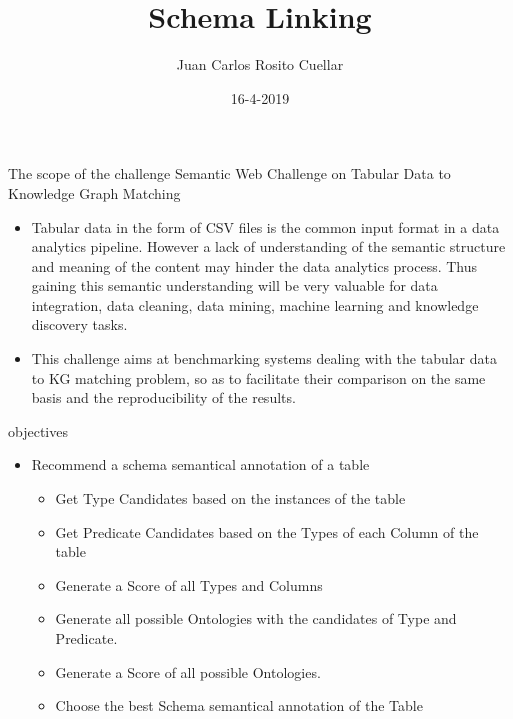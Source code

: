 \documentclass{beamer}
\title[Schema-Linking \hspace{0.5cm}\insertframenumber/\inserttotalframenumber]{Schema Linking}
\author{Juan Carlos Rosito Cuellar}
\institute{Universita' degli studi di Milano-Bicocca}
\date{16-4-2019}
\begin{document}
\begin{frame}
	\titlepage
\end{frame}


\begin{frame}{The scope of the challenge}
	Semantic Web Challenge on Tabular Data to Knowledge Graph Matching
	\begin{itemize}
		\item Tabular data in the form of CSV files is the common input format in a data analytics pipeline. However a lack of understanding of the semantic structure and meaning of the content may hinder the data analytics process. Thus gaining this semantic understanding will be very valuable for data integration, data cleaning, data mining, machine learning and knowledge discovery tasks.
		\item This challenge aims at benchmarking systems dealing with the tabular data to KG matching problem, so as to facilitate their comparison on the same basis and the reproducibility of the results.
	\end{itemize}
\end{frame}

\begin{frame}{objectives}
	\begin{itemize}
		\item Recommend a schema semantical annotation of a table
		      \begin{itemize}
			      \item Get Type Candidates based on the instances of the table
			      \item Get Predicate Candidates based on the Types of each Column of the table
			      \item Generate a Score of all Types and Columns
			      \item Generate all possible Ontologies with the candidates of Type and Predicate.
			      \item Generate a Score of all possible Ontologies.
			      \item Choose the best Schema semantical annotation of the Table
		      \end{itemize}
	\end{itemize}

\end{frame}
\end{document}
